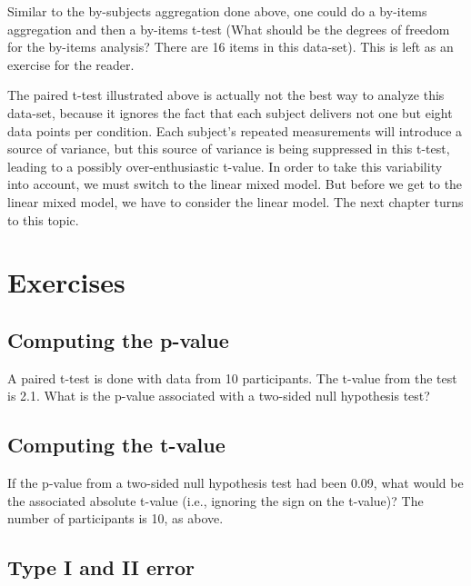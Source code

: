 \documentclass[12pt,]{krantz}
\begin{document}
Similar to the by-subjects aggregation done above, one could do a by-items aggregation and then a by-items t-test (What should be the degrees of freedom for the by-items analysis? There are 16 items in this data-set). This is left as an exercise for the reader.

The paired t-test illustrated above is actually not the best way to analyze this data-set, because it ignores the fact that each subject delivers not one but eight data points per condition. Each subject's repeated measurements will introduce a source of variance, but this source of variance is being suppressed in this t-test, leading to a possibly over-enthusiastic t-value. In order to take this variability into account, we must switch to the linear mixed model. But before we get to the linear mixed model, we have to consider the linear model. The next chapter turns to this topic.

\hypertarget{sec:SamplingDistrnexercises}{%
\section{Exercises}\label{sec:SamplingDistrnexercises}}

\hypertarget{sec:SamplingDistrnexercisesPart1}{%
\subsection{Computing the p-value}\label{sec:SamplingDistrnexercisesPart1}}

A paired t-test is done with data from 10 participants. The t-value from the test is 2.1. What is the p-value associated with a two-sided null hypothesis test?

\hypertarget{sec:SamplingDistrnexercisesPart2}{%
\subsection{Computing the t-value}\label{sec:SamplingDistrnexercisesPart2}}

If the p-value from a two-sided null hypothesis test had been 0.09, what would be the associated absolute t-value (i.e., ignoring the sign on the t-value)? The number of participants is 10, as above.

\hypertarget{sec:SamplingDistrnexercisesPart3}{%
\subsection{Type I and II error}\label{sec:SamplingDistrnexercisesPart3}}
\end{document}

